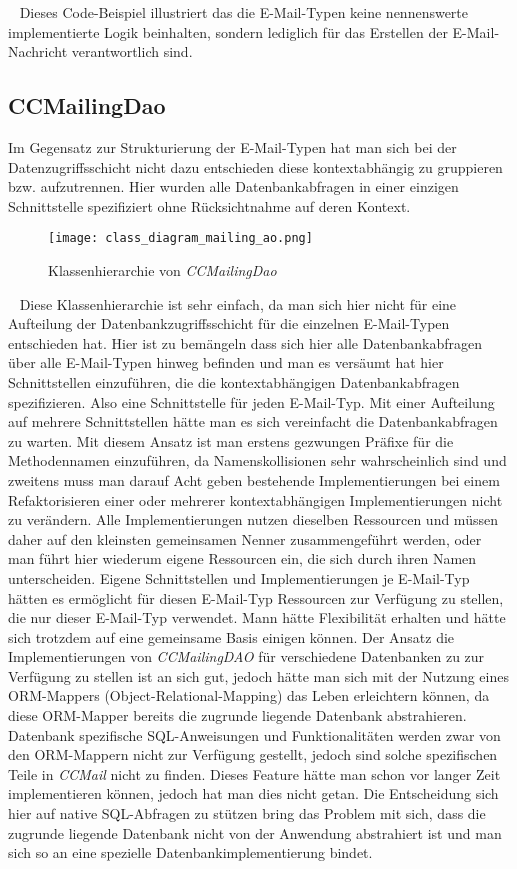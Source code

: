 \ \newline
Dieses Code-Beispiel illustriert das die E-Mail-Typen keine nennenswerte implementierte Logik beinhalten, sondern lediglich für das Erstellen der E-Mail-Nachricht verantwortlich sind. 

\subsection{CCMailingDao}
Im Gegensatz zur Strukturierung der E-Mail-Typen hat man sich bei der Datenzugriffsschicht nicht dazu entschieden diese kontextabhängig zu gruppieren bzw. aufzutrennen. Hier wurden alle Datenbankabfragen in einer einzigen Schnittstelle spezifiziert ohne Rücksichtnahme auf deren Kontext.
\newline
\begin{figure}[h]
\centering
\texttt{[image: class\_diagram\_mailing\_ao.png]} 
\caption{Klassenhierarchie von \emph{CCMailingDao}}
\label{fig:klassen-hierarchie-ccmailingdao}
\end{figure}
\ \newline
Diese Klassenhierarchie ist sehr einfach, da man sich hier nicht für eine Aufteilung der Datenbankzugriffsschicht für die einzelnen E-Mail-Typen entschieden hat. Hier ist zu bemängeln dass sich hier alle Datenbankabfragen über alle E-Mail-Typen hinweg befinden und man es versäumt hat hier Schnittstellen einzuführen, die die kontextabhängigen Datenbankabfragen spezifizieren. Also eine Schnittstelle für jeden E-Mail-Typ. Mit einer Aufteilung auf mehrere Schnittstellen hätte man es sich vereinfacht die Datenbankabfragen zu warten. Mit diesem Ansatz ist man erstens gezwungen Präfixe für die Methodennamen einzuführen, da Namenskollisionen sehr wahrscheinlich sind und zweitens muss man darauf Acht geben bestehende Implementierungen bei einem Refaktorisieren einer oder mehrerer kontextabhängigen Implementierungen nicht zu verändern. Alle Implementierungen nutzen dieselben Ressourcen und müssen daher auf den kleinsten gemeinsamen Nenner zusammengeführt werden, oder man führt hier wiederum eigene Ressourcen ein, die sich durch ihren Namen unterscheiden. Eigene Schnittstellen und Implementierungen je E-Mail-Typ hätten es ermöglicht für diesen E-Mail-Typ Ressourcen zur Verfügung zu stellen, die nur dieser E-Mail-Typ verwendet. Mann hätte Flexibilität erhalten und hätte sich trotzdem auf eine gemeinsame Basis einigen können. Der Ansatz die Implementierungen von \emph{CCMailingDAO} für verschiedene Datenbanken zu zur Verfügung zu stellen ist an sich gut, jedoch hätte man sich mit der Nutzung eines ORM-Mappers (Object-Relational-Mapping) das Leben erleichtern können, da diese ORM-Mapper bereits die zugrunde liegende Datenbank abstrahieren. Datenbank spezifische SQL-Anweisungen und Funktionalitäten werden zwar von den ORM-Mappern nicht zur Verfügung gestellt, jedoch sind solche spezifischen Teile in \emph{CCMail} nicht zu finden. Dieses Feature hätte man schon vor langer Zeit implementieren können, jedoch hat man dies nicht getan. Die Entscheidung sich hier auf native SQL-Abfragen zu stützen bring das Problem mit sich, dass die zugrunde liegende Datenbank nicht von der Anwendung abstrahiert ist und man sich so an eine spezielle Datenbankimplementierung bindet.

